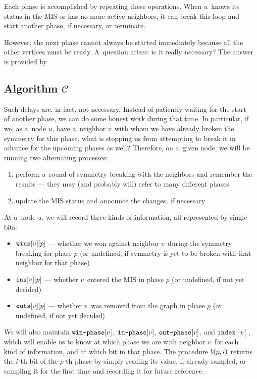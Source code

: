 \documentclass{article}
\DeclarePairedDelimiter{\parenthesesdelimiter}{(}{)}
\def\pars{\parenthesesdelimiter*}
\DeclarePairedDelimiter{\bracketsdelimiter}{[}{]}
\def\brackets{\bracketsdelimiter*}
\begin{document}
Each phase is accomplished by repeating these operations. When \(u\)~knows its status in the MIS or has no more active neighbors, it can break this loop and start another phase, if necessary, or terminate.

However, the next phase cannot always be started immediately because all the other vertices must be ready. A~question arises: is it really necessary? The answer is provided by

\subsection{Algorithm \texorpdfstring{\(\mathcal{C}\)}{C}}
Such delays are, in fact, not necessary. Instead of patiently waiting for the start of another phase, we can do some honest work during that time. In particular, if we, as a~node \(u\), have a~neighbor \(v\)~with whom we have already broken the symmetry for this phase, what is stopping us from attempting to break it in advance for the upcoming phases as well? Therefore, on a~given node, we will be running two alternating processes:
\begin{enumerate}
    \item perform a~round of symmetry breaking with the neighbors and remember the results --- they may (and probably will) refer to many different phases
    \item update the MIS status and announce the changes, if necessary
\end{enumerate}
At a~node \(u\), we will record three kinds of information, all represented by single bits:
\begin{itemize}
    \item \(\texttt{wins}\brackets{v}\brackets{p}\) --- whether we won against neighbor \(v\)~during the symmetry breaking for phase \(p\) (or undefined, if symmetry is yet to be broken with that neighbor for that phase)
    \item \(\texttt{ins}\brackets{v}\brackets{p}\) --- whether \(v\)~entered the MIS in phase \(p\) (or undefined, if not yet decided)
    \item \(\texttt{outs}\brackets{v}\brackets{p}\) --- whether \(v\)~was removed from the graph in phase \(p\) (or undefined, if not yet decided)
\end{itemize}
We will also maintain \(\texttt{win-phase}\brackets{v}\), \(\texttt{in-phase}\brackets{v}\), \(\texttt{out-phase}\brackets{v}\), and \(\texttt{index}[v]\), which will enable us to know at which phase we are with neighbor \(v\)~for each kind of information, and at which bit in that phase. The procedure \(b\pars{p, i}\) returns the \(i\)-th bit of the \(p\)-th phase by simply reading its value, if already sampled, or sampling it for the first time and recording it for future reference.
\end{document}
